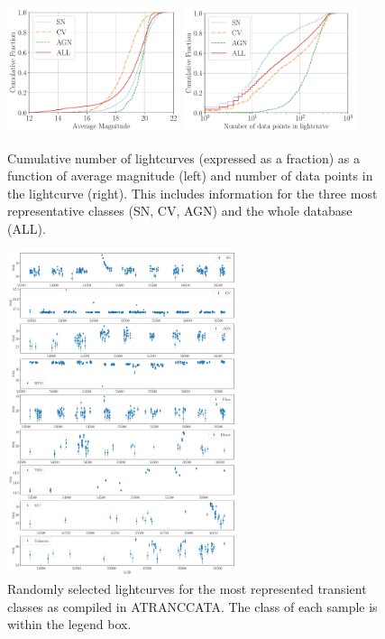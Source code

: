 \documentclass[usenatbib]{mnras}
\begin{document}
\begin{figure}
	\includegraphics[width=0.45\textwidth]{cumulative_magnitude.pdf}
  \includegraphics[width=0.45\textwidth]{cumulative_classes.pdf}
  \caption{Cumulative number of lightcurves (expressed as a fraction)
    as a function of average magnitude (left) and number of data
    points in the lightcurve (right).
    This includes information for the three most representative
    classes (SN, CV, AGN) and the whole database (ALL).}
  \label{fig:cumulative}
\end{figure} 


\begin{figure}
  \includegraphics[width=0.6\textwidth]{examples_transient.pdf}
  \caption{Randomly selected lightcurves for the most represented transient classes as compiled in ATRANCCATA. The class of each sample is within the legend box. }  
  \label{fig:examples_transient}
\end{figure} 
\end{document}
